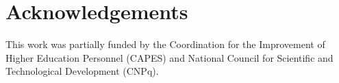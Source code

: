 \section{Acknowledgements}\label{Sec:acknowledgements}
	
This work was partially funded by the Coordination for the Improvement of Higher Education Personnel (CAPES) and National Council for Scientific and Technological Development (CNPq).